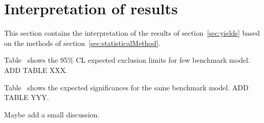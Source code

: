 \section{Interpretation of results}
\label{sec:interpretation}

This section contains the interpretation of the results of section~\ref{sec:yields} based on the methods of section~\ref{sec:statisticalMethod}.

Table~%
shows the 95\% CL expected exclusion limits for few benchmark model.
{\color{red} ADD TABLE XXX.}

Table~%
shows the expected significances for the same benchmark model.
{\color{red} ADD TABLE YYY.}


{\color{red} Maybe add a small discussion.}
